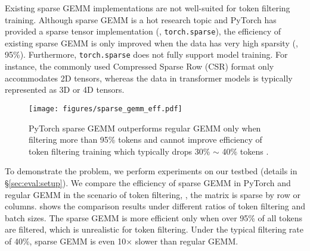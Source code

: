  Existing sparse GEMM implementations are not well-suited for token filtering training. Although sparse GEMM is a hot research topic and PyTorch has provided a sparse tensor implementation (\ie, \texttt{torch.sparse}), the efficiency of existing sparse GEMM is only improved when the data has very high sparsity (\eg, 95\%). Furthermore, \texttt{torch.sparse} does not fully support model training. For instance, the commonly used Compressed Sparse Row (CSR) format only accommodates 2D tensors, whereas the data in transformer models is typically represented as 3D or 4D tensors.

\begin{figure}[t]
	\centering
	\texttt{[image: figures/sparse\_gemm\_eff.pdf]}
	\caption{PyTorch sparse GEMM outperforms regular GEMM only when filtering more than 95\% tokens and cannot improve efficiency of token filtering training which typically drops 30\% $\sim$ 40\% tokens \cite{RHO}.}
	\label{fig:sparse_gemm_eff}
\end{figure}

To demonstrate the problem, we perform experiments on our testbed (details in \S\ref{sec:eval:setup}).
We compare the efficiency of sparse GEMM in PyTorch and regular GEMM in the scenario of token filtering, \ie, the matrix is sparse by row or columns.  shows the comparison results under different ratios of token filtering and batch sizes. The sparse GEMM is more efficient only when over 95\% of all tokens are filtered, which is unrealistic for token filtering. Under the typical filtering rate of 40\%, sparse GEMM is even 10$\times$ slower than regular GEMM. 

